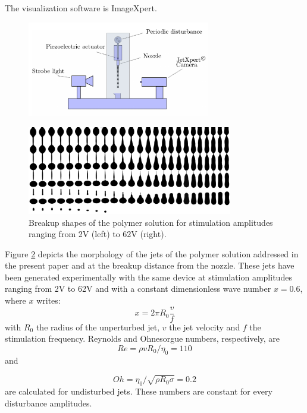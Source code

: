 \documentclass[twocolumn,10pt]{asme2ej}
\begin{document}
The visualization software is ImageXpert.

\begin{figure}[h]
    \centering
    \includegraphics[width=8cm]{device.png}
    \caption{}
    \label{device}
\end{figure}

\begin{figure}[t]
    \centering
    \includegraphics[width=0.8\textwidth]{Encre/expAll.png}
    \caption{Breakup shapes of the polymer solution for stimulation amplitudes ranging from 2V (left) to 62V (right).} 
    \label{fig:expAll}
\end{figure}

Figure \ref{fig:expAll} depicts the morphology of the jets of the polymer solution addressed in the present paper and at the breakup distance from the nozzle. These jets have been generated  experimentally with the same device at stimulation amplitudes ranging from 2V to 62V and with a constant dimensionless wave number $x = 0.6$, where $x$ writes:
\begin{equation}\label{eq:waveNbr}
    x=2 \pi R_0 \frac{v}{f}
\end{equation}
with $R_0$ the radius of the unperturbed jet, $v$ the jet velocity and $f$ the stimulation frequency. Reynolds and Ohnesorgue numbers, respectively, are
\begin{equation}
    Re= \rho v R_0 / \eta_0 = 110
\end{equation} and 
   
\begin{equation}
    Oh=\eta_0/\sqrt{\rho R_0 \sigma} = 0.2
\end{equation}
are calculated for undisturbed jets. These numbers are constant for every disturbance amplitudes.
\end{document}
